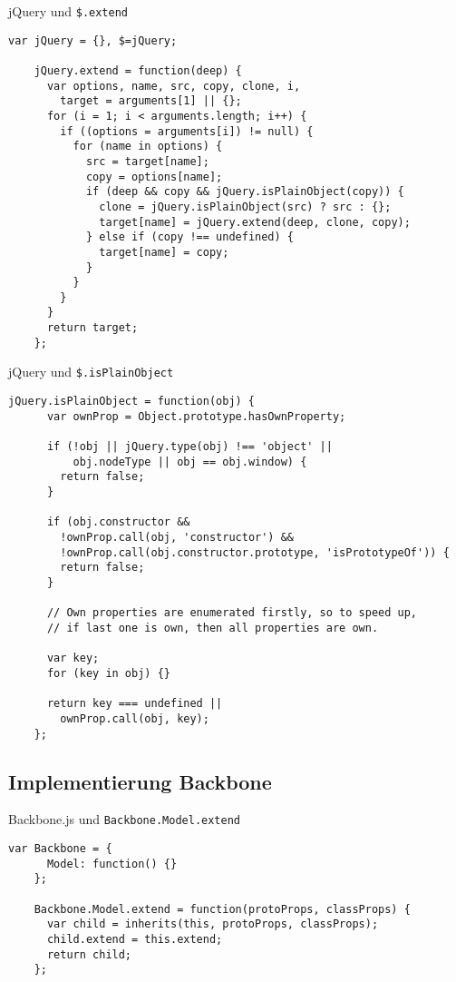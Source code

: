 \begin{frame}[fragile]{jQuery und \texttt{\$.extend}}
  \begin{lstlisting}[gobble=4]
    var jQuery = {}, $=jQuery;
    
    jQuery.extend = function(deep) {
      var options, name, src, copy, clone, i,
        target = arguments[1] || {};    
      for (i = 1; i < arguments.length; i++) {
        if ((options = arguments[i]) != null) {
          for (name in options) {
            src = target[name];
            copy = options[name];
            if (deep && copy && jQuery.isPlainObject(copy)) {
              clone = jQuery.isPlainObject(src) ? src : {};
              target[name] = jQuery.extend(deep, clone, copy);
            } else if (copy !== undefined) {
              target[name] = copy;
            }
          }
        }
      }
      return target;
    };
  \end{lstlisting}
\end{frame}

\begin{frame}[fragile]{jQuery und \texttt{\$.isPlainObject}}
  \begin{lstlisting}[gobble=4]
    jQuery.isPlainObject = function(obj) {
      var ownProp = Object.prototype.hasOwnProperty;
    
      if (!obj || jQuery.type(obj) !== 'object' ||
          obj.nodeType || obj == obj.window) {
        return false;
      }
    
      if (obj.constructor &&
        !ownProp.call(obj, 'constructor') &&
        !ownProp.call(obj.constructor.prototype, 'isPrototypeOf')) {
        return false;
      }
    
      // Own properties are enumerated firstly, so to speed up,
      // if last one is own, then all properties are own.
    
      var key;
      for (key in obj) {}
    
      return key === undefined ||
        ownProp.call(obj, key);
    };
  \end{lstlisting}
\end{frame}

\subsection{Implementierung Backbone}

\begin{frame}[fragile]{Backbone.js und \texttt{Backbone.Model.extend}}
  \begin{lstlisting}[gobble=4]
    var Backbone = {
      Model: function() {}
    };
    
    Backbone.Model.extend = function(protoProps, classProps) {
      var child = inherits(this, protoProps, classProps);
      child.extend = this.extend;
      return child;
    };
  \end{lstlisting}
\end{frame}

